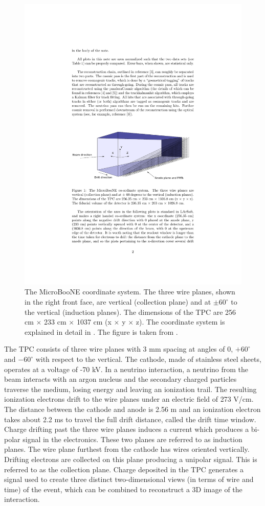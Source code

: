 \documentclass[a4paper,11pt]{article}
\begin{document}
\begin{figure}[htbp]
  \begin{center}
    \includegraphics[width=0.8\linewidth]{figures/coord.pdf}

    \caption{The MicroBooNE coordinate system. The three wire planes, shown in the right front face, are vertical (collection plane) and at  $\pm60^{\circ}$ to the vertical (induction planes). The dimensions of the TPC are 256 cm $\times$ 233 cm $\times$ 1037 cm (x $\times$ y $\times$ z). The coordinate system is explained in detail in \cite{mcdata}. The figure is taken from \cite{mcdata}.} \label{fig:coord}
  \end{center}
\end{figure}

The TPC consists of three wire planes with 3 mm spacing at angles of 0,  $+60^{\circ}$ and  $-60^{\circ}$ with respect to the vertical. The cathode, made of stainless steel sheets, operates at a voltage of -70 kV. In a neutrino interaction, a neutrino from the beam interacts with an argon nucleus and the secondary charged particles traverse the medium, losing energy and leaving an ionization trail. The resulting ionization electrons drift to the wire planes under an electric field of 273 V/cm. The distance between the cathode and anode is 2.56 m and an ionization electron takes about 2.2 ms to travel the full drift distance, called the drift time window. Charge drifting past the three wire planes induces a current which produces a bi-polar signal in the electronics. These two planes are referred to as induction planes. The wire plane furthest from the cathode has wires oriented vertically. Drifting electrons are collected on this plane producing a unipolar signal. This is referred to as the collection plane. Charge deposited in the TPC generates a signal used to create three distinct two-dimensional views (in terms of wire and time) of the event, which can be combined to reconstruct a 3D image of the interaction.
\end{document}
